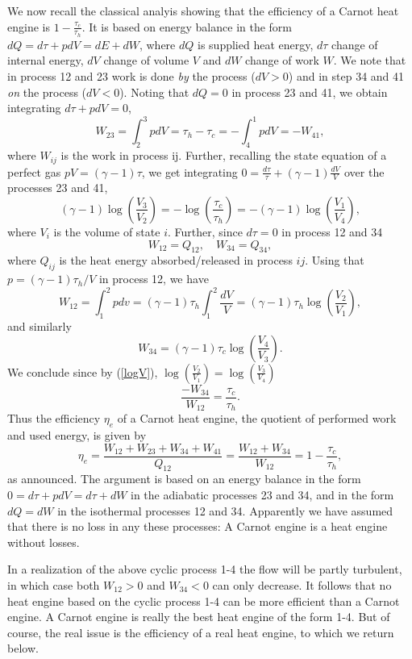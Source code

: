 We now recall the classical analyis showing that 
the efficiency of a Carnot heat engine is
$1-\frac{\tau_c}{\tau_h}$. It is based on energy balance
in the form $dQ=d\tau +pdV=dE+dW$, where $dQ$ is supplied heat energy,
$d\tau$ change of internal energy, $dV$ change of volume $V$
and $dW$ change of work $W$.
We note that in process 12 and 23 work is done \emph{by} the process 
($dV>0$) and in step 34 and 41 \emph{on} the process ($dV<0$). 
Noting that $dQ=0$ in process 23 and 41, we obtain integrating
$d\tau +pdV=0$, 
\[
W_{23}=\int_2^3pdV=\tau_h-\tau_c=-\int_4^1pdV=-W_{41},
\]
where $W_{ij}$ is the work in process ij.
Further, recalling the state equation of a perfect gas
 $pV=(\gamma -1)\tau$, we get
integrating $0=\frac{d\tau}{\tau}+(\gamma -1)\frac{dV}{V}$ over
the processes 23 and 41,
\begin{equation}\label{logV}
(\gamma -1)\log(\frac{V_3}{V_2})=-\log(\frac{\tau_c}{\tau_h})
=-(\gamma -1)\log(\frac{V_1}{V_4}),
\end{equation}
where $V_i$ is the volume of state $i$.
Further, since $d\tau =0$ in process 12 and 34 
\[
W_{12}=Q_{12}, \quad W_{34}=Q_{34},
\]
where $Q_{ij}$ is the heat energy absorbed/released in process $ij$.
Using that $p=(\gamma -1)\tau_h/V$ in process 12, we have
\[
W_{12}=\int_1^2 pdv=(\gamma -1)\tau_h\int_1^2 \frac{dV}{V}=
(\gamma -1)\tau_h\log(\frac{V_2}{V_1}),
\]
and similarly
\[
W_{34}=(\gamma -1)\tau_c\log(\frac{V_4}{V_3}).
\]
We conclude since by (\ref{logV}), $\log(\frac{V_2}{V_1})=\log(\frac{V_3}{V_4})$\[
\frac{-W_{34}}{W_{12}}=\frac{\tau_c}{\tau_h}.
\]
Thus the efficiency $\eta_e$ of a Carnot heat engine, 
the quotient of performed work and used energy,
is given by
\[
\eta_e =\frac{W_{12}+W_{23}+W_{34}+W_{41}}{Q_{12}}=\frac{W_{12}+W_{34}}{W_{12}}=1-\frac{\tau_c}{\tau_h},
\]
as announced. The argument is based on an energy balance 
in the form $0=d\tau +pdV=d\tau +dW$ in the adiabatic
processes 23 and 34, and in the form $dQ=dW$
in the isothermal processes 12 and 34. Apparently we
have assumed that there is no loss in any these processes:
A Carnot engine is a heat engine without losses.   

In a realization of the above cyclic process 1-4 the flow
will be partly turbulent, in which case 
both $W_{12}>0$ and $W_{34}<0$
can only decrease. It follows that no heat engine
based on the cyclic process 1-4 can be more efficient than
a Carnot engine. A Carnot engine is really the best heat engine of the
form 1-4. But of course, the real issue is the efficiency of a real
heat engine, to which we return below. 



